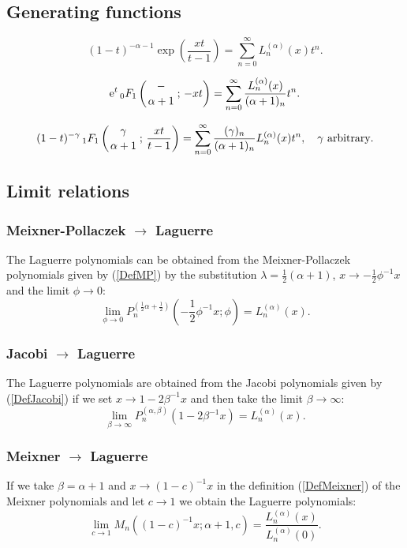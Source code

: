 \documentclass[envcountchap,graybox]{svmono}
\newcounter{rom}
\newcommand{\hyp}[5]{\mbox{}_{#1}{F}_{#2}
\left(\genfrac{}{}{0pt}{}{#3}{#4}\,;\,#5\right)}
\newcommand{\e}{\textrm{e}}
\begin{document}
\subsection*{Generating functions}
\begin{equation}
\label{GenLaguerre1}
(1-t)^{-\alpha-1}\exp\left(\frac{xt}{t-1}\right)=
\sum_{n=0}^{\infty}L_n^{(\alpha)}(x)t^n.
\end{equation}

\begin{equation}
\label{GenLaguerre2}
\e^t\,\hyp{0}{1}{-}{\alpha+1}{-xt}
=\sum_{n=0}^{\infty}\frac{L_n^{(\alpha)}(x)}{(\alpha+1)_n}t^n.
\end{equation}

\begin{equation}
\label{GenLaguerre3}
(1-t)^{-\gamma}\,\hyp{1}{1}{\gamma}{\alpha+1}{\frac{xt}{t-1}}
=\sum_{n=0}^{\infty}\frac{(\gamma)_n}{(\alpha+1)_n}L_n^{(\alpha)}(x)t^n,
\quad\textrm{$\gamma$ arbitrary}.
\end{equation}

\subsection*{Limit relations}

\subsubsection*{Meixner-Pollaczek $\rightarrow$ Laguerre}
The Laguerre polynomials can be obtained from the Meixner-Pollaczek polynomials given by
(\ref{DefMP}) by the substitution $\lambda=\frac{1}{2}(\alpha+1)$,
$x\rightarrow -\frac{1}{2}\phi^{-1}x$ and the limit $\phi\rightarrow 0$:
$$\lim_{\phi\rightarrow 0}
P_n^{(\frac{1}{2}\alpha+\frac{1}{2})}(-\textstyle\frac{1}{2}\phi^{-1}x;\phi)=L_n^{(\alpha)}(x).$$

\subsubsection*{Jacobi $\rightarrow$ Laguerre}
The Laguerre polynomials are obtained from the Jacobi polynomials given by (\ref{DefJacobi})
if we set $x\rightarrow 1-2\beta^{-1}x$ and then take the limit $\beta\rightarrow\infty$:
$$\lim_{\beta\rightarrow\infty}
P_n^{(\alpha,\beta)}(1-2\beta^{-1}x)=L_n^{(\alpha)}(x).$$

\subsubsection*{Meixner $\rightarrow$ Laguerre}
If we take $\beta=\alpha+1$ and $x\rightarrow (1-c)^{-1}x$ in the definition
(\ref{DefMeixner}) of the Meixner polynomials and let $c\rightarrow 1$ we obtain
the Laguerre polynomials:
$$\lim_{c\rightarrow 1}
M_n((1-c)^{-1}x;\alpha+1,c)=\frac{L_n^{(\alpha)}(x)}{L_n^{(\alpha)}(0)}.$$
\end{document}
